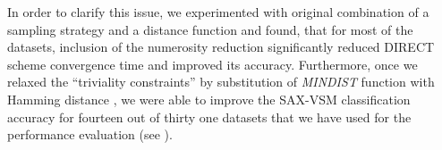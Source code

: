 \documentclass{llncs}
\begin{document}
In order to clarify this issue, we experimented with original combination of a sampling 
strategy and a distance function and found, that for most of the datasets, inclusion 
of the numerosity reduction significantly reduced DIRECT scheme convergence time 
and improved its accuracy. 
Furthermore, once we relaxed the ``triviality constraints'' by substitution of 
\textit{MINDIST} function \cite{streaming_sax} with Hamming distance \cite{hamming}, 
we were able to improve the SAX-VSM classification accuracy for fourteen 
out of thirty one datasets that we have used for the performance evaluation (see
\cite{jmotif}).
%
%
%
%
\end{document}
